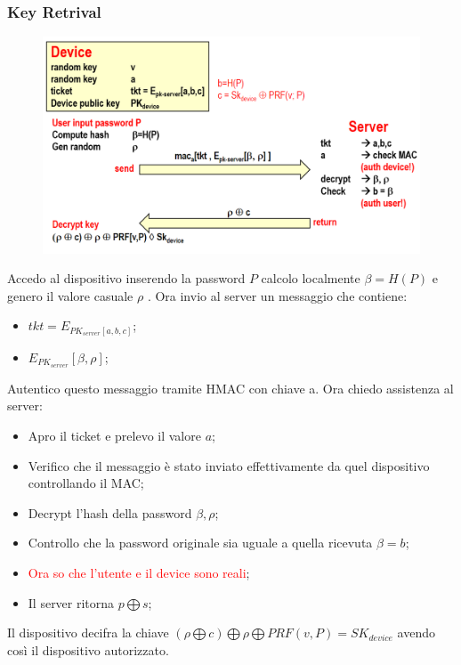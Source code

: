 \documentclass{book}
\begin{document}
\subsubsection{Key Retrival}
\begin{figure}[h]
	\centering
	\includegraphics[scale=0.4]{2022-01-06-17-06-20.png}%
\end{figure}
Accedo al dispositivo inserendo la password \(P\) calcolo localmente \(\beta =H(P)\) e genero il valore casuale \(\rho \) \@. Ora invio al server un messaggio che contiene:\begin{itemize}
	\item \(tkt=E_{PK_{server}[a,b,c]}\);
	\item \(E_{PK_{server}}[\beta ,\rho ]\);
\end{itemize}
Autentico questo messaggio tramite HMAC con chiave a.\newline
Ora chiedo assistenza al server:\begin{itemize}
	\item Apro il ticket e prelevo il valore \(a\);
	\item Verifico che il messaggio è stato inviato effettivamente da quel dispositivo controllando il MAC\@;
	\item Decrypt l'hash della password \(\beta ,\rho \);
	\item Controllo che la password originale sia uguale a quella ricevuta \(\beta = b\);
	\item \textcolor{red}{Ora so che l'utente e il device sono reali};
	\item Il server ritorna \(p\bigoplus s\);
\end{itemize}
Il dispositivo decifra la chiave \((\rho \bigoplus c)\bigoplus \rho \bigoplus PRF(v,P)=SK_{device}\) avendo così il dispositivo autorizzato.
\end{document}
